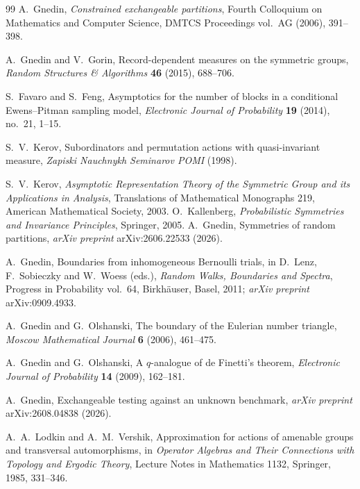 \documentclass[11pt]{article}
\theoremstyle{plain}
\theoremstyle{definition}
\begin{document}
\begin{thebibliography}{99}
 A.~Gnedin, 
\emph{Constrained exchangeable partitions}, 
Fourth Colloquium on Mathematics and Computer Science, 
DMTCS Proceedings vol.~AG (2006), 391--398.



 A.~Gnedin and V.~Gorin, Record-dependent measures on the symmetric groups, \emph{Random Structures \& Algorithms} \textbf{46} (2015), 688--706.

 S.~Favaro and S.~Feng, Asymptotics for the number of blocks in a conditional Ewens--Pitman sampling model, \emph{Electronic Journal of Probability} \textbf{19} (2014), no.~21, 1--15. 


 S.~V.~Kerov, Subordinators and permutation actions with quasi-invariant measure, \emph{Zapiski Nauchnykh Seminarov POMI} (1998).

 S.~V.~Kerov, \emph{Asymptotic Representation Theory of the Symmetric Group and its Applications in Analysis}, Translations of Mathematical Monographs 219, American Mathematical Society, 2003.
 O.~Kallenberg, \emph{Probabilistic Symmetries and Invariance Principles}, Springer, 2005.
 A.~Gnedin, Symmetries of random partitions, \emph{arXiv preprint} arXiv:2606.22533 (2026).

 A.~Gnedin, Boundaries from inhomogeneous Bernoulli trials, in D.~Lenz, F.~Sobieczky and W.~Woess (eds.), \emph{Random Walks, Boundaries and Spectra}, Progress in Probability vol.~64, Birkh\"auser, Basel, 2011; \emph{arXiv preprint} arXiv:0909.4933.

 A.~Gnedin and G.~Olshanski, The boundary of the Eulerian number triangle, \emph{Moscow Mathematical Journal} \textbf{6} (2006), 461--475.

 A.~Gnedin and G.~Olshanski, A $q$-analogue of de Finetti's theorem, \emph{Electronic Journal of Probability} \textbf{14} (2009), 162--181.

 A.~Gnedin, Exchangeable testing against an unknown benchmark, \emph{arXiv preprint} arXiv:2608.04838 (2026).

 A.~A.~Lodkin and A.~M.~Vershik, Approximation for actions of amenable groups and transversal automorphisms, in \emph{Operator Algebras and Their Connections with Topology and Ergodic Theory}, Lecture Notes in Mathematics 1132, Springer, 1985, 331--346.


\end{thebibliography}
\end{document}
